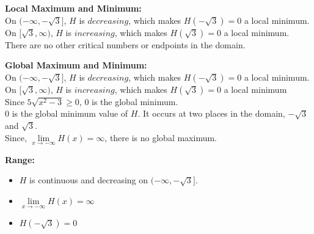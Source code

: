 \documentclass{ximera}
\begin{document}
\textbf{\textcolor{blue!55!black}{Local Maximum and Minimum:}} \\





On $(-\infty, -\sqrt{3} ]$, $H$ is $decreasing$, which makes $H(-\sqrt{3}) = 0$ a local minimum.  \\


On $[ \sqrt{3}, \infty)$, $H$ is $increasing$, which makes $H(\sqrt{3}) = 0$ a local minimum.  \\



There are no other critical numbers or endpoints in the domain.









\textbf{\textcolor{blue!55!black}{Global Maximum and Minimum:}} \\



On $(-\infty, -\sqrt{3} ]$, $H$ is $decreasing$, which makes $H(-\sqrt{3}) = 0$ a local minimum. \\


On $[ \sqrt{3}, \infty)$, $H$ is $increasing$, which makes $H(\sqrt{3}) = 0$ a local minimum  \\




Since $5 \sqrt{x^2-3} \geq 0$, $0$ is the global minimum. \\



$0$ is the global minimum value of $H$. It occurs at two places in the domain, $-\sqrt{3}$ and $\sqrt{3}$. \\



Since, $\lim\limits_{x \to -\infty} H(x) = \infty$, there is no global maximum. 














\textbf{\textcolor{blue!55!black}{Range:}} \\



\begin{itemize}
\item $H$ is continuous and decreasing on $( -\infty, -\sqrt{3} ]$. \\
\item $\lim\limits_{x \to -\infty} H(x) = \infty$ \\
\item $H(-\sqrt{3}) = 0$
\end{itemize}
\end{document}
